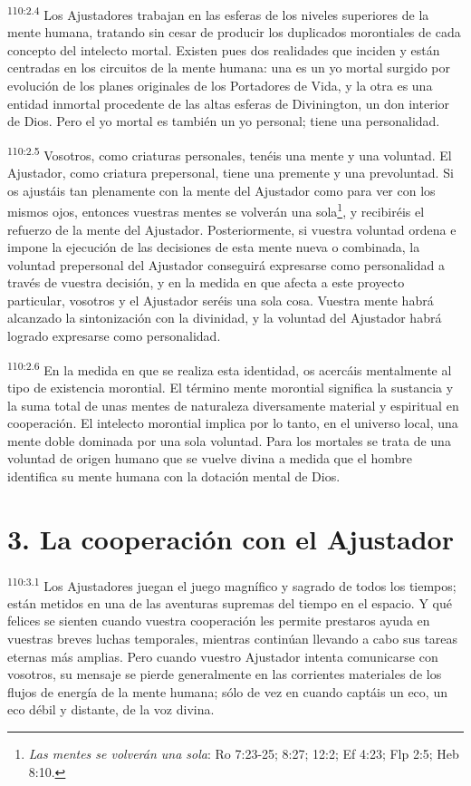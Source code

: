 \documentclass[twoside, 11pt]{book}
\begin{document}
\par
\textsuperscript{110:2.4} Los Ajustadores trabajan en las esferas de los niveles superiores de la mente humana, tratando sin cesar de producir los duplicados morontiales de cada concepto del intelecto mortal. Existen pues dos realidades que inciden y están centradas en los circuitos de la mente humana: una es un yo mortal surgido por evolución de los planes originales de los Portadores de Vida, y la otra es una entidad inmortal procedente de las altas esferas de Divinington, un don interior de Dios. Pero el yo mortal es también un yo personal; tiene una personalidad.

\par
\textsuperscript{110:2.5} Vosotros, como criaturas personales, tenéis una mente y una voluntad. El Ajustador, como criatura prepersonal, tiene una premente y una prevoluntad. Si os ajustáis tan plenamente con la mente del Ajustador como para ver con los mismos ojos, entonces vuestras mentes se volverán una sola\footnote{\textit{Las mentes se volverán una sola}: Ro 7:23-25; 8:27; 12:2; Ef 4:23; Flp 2:5; Heb 8:10.}, y recibiréis el refuerzo de la mente del Ajustador. Posteriormente, si vuestra voluntad ordena e impone la ejecución de las decisiones de esta mente nueva o combinada, la voluntad prepersonal del Ajustador conseguirá expresarse como personalidad a través de vuestra decisión, y en la medida en que afecta a este proyecto particular, vosotros y el Ajustador seréis una sola cosa. Vuestra mente habrá alcanzado la sintonización con la divinidad, y la voluntad del Ajustador habrá logrado expresarse como personalidad.

\par
\textsuperscript{110:2.6} En la medida en que se realiza esta identidad, os acercáis mentalmente al tipo de existencia morontial. El término mente morontial significa la sustancia y la suma total de unas mentes de naturaleza diversamente material y espiritual en cooperación. El intelecto morontial implica por lo tanto, en el universo local, una mente doble dominada por una sola voluntad. Para los mortales se trata de una voluntad de origen humano que se vuelve divina a medida que el hombre identifica su mente humana con la dotación mental de Dios.

\section*{3. La cooperación con el Ajustador}
\par
\textsuperscript{110:3.1} Los Ajustadores juegan el juego magnífico y sagrado de todos los tiempos; están metidos en una de las aventuras supremas del tiempo en el espacio. Y qué felices se sienten cuando vuestra cooperación les permite prestaros ayuda en vuestras breves luchas temporales, mientras continúan llevando a cabo sus tareas eternas más amplias. Pero cuando vuestro Ajustador intenta comunicarse con vosotros, su mensaje se pierde generalmente en las corrientes materiales de los flujos de energía de la mente humana; sólo de vez en cuando captáis un eco, un eco débil y distante, de la voz divina.
\end{document}
